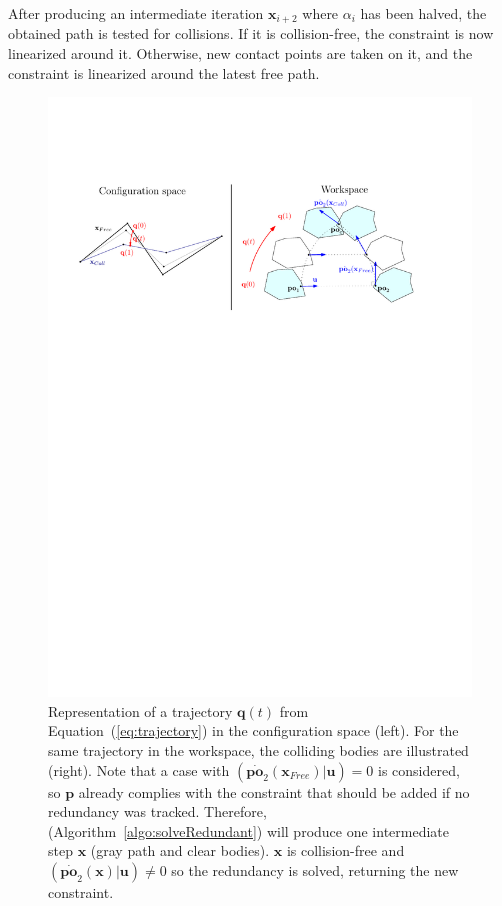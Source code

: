 \documentclass{tADR2e}
\newcommand\p{\mathbf{p}}
\newcommand\conf{\mathbf{q}}
\newcommand\xx{\mathbf{x}} %
\newcommand\po{\mathbf{po}}
\begin{document}
After producing an intermediate iteration $\xx_{i+2}$ where $\alpha_i$ has
been halved, the obtained path is tested for collisions. If it is collision-free, the 
constraint is now linearized around it. Otherwise, new contact points are taken 
on it, and the constraint is linearized around the latest free path.

\begin{figure}
	\centering
	\includegraphics[width=15.8cm]{convergence-diagram.pdf}
	\caption{Representation of a trajectory $\conf (t)$ from 
	Equation~(\ref{eq:trajectory}) in the 
	configuration space (left). For the same trajectory in the workspace, the 
	colliding bodies are illustrated (right). Note that a case with 
	$(\dot{\po_2}(\xx_{Free})|\mathbf{u})=0$ is considered, so $\p$ already complies 
	with the constraint that should be added if no redundancy was tracked. Therefore, 
	(Algorithm~\ref{algo:solveRedundant}) will produce one intermediate step
	$\xx$ (gray path and clear bodies). $\xx$ is collision-free and 
	$(\dot{\po_2}(\xx)|\mathbf{u})\neq 0$ so the redundancy is solved, 
	returning the new constraint.}
	\label{fig:convergence-diagram}
\end{figure}
\end{document}
